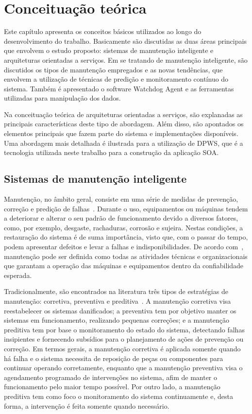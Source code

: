 \chapter{Conceituação teórica}
\label{cha:conceituacao-teorica}

Este capítulo apresenta os conceitos básicos utilizados ao longo do desenvolvimento do trabalho.
Basicamente são discutidas as duas áreas principais que envolvem o estudo proposto: sistemas de
manutenção inteligente e arquiteturas orientadas a serviços. Em se tratando de manutenção
inteligente, são discutidos os tipos de manutenção empregados e as novas tendências, que envolvem a
utilização de técnicas de predição e monitoramento contínuo do sistema. Também é apresentado o
software Watchdog Agent e as ferramentas utilizadas para manipulação dos dados.

Na conceituação teórica de arquiteturas orientadas a serviços, são explanadas as principais
características deste tipo de abordagem. Além disso, são apontados os elementos principais que fazem
parte do sistema e implementações disponíveis. Uma abordagem mais detalhada é ilustrada para a
utilização de \gls{DPWS}, que é a tecnologia utilizada neste trabalho para a construção da aplicação
\gls{SOA}.


\section{Sistemas de manutenção inteligente}
\label{sec:manutencao-inteligente}

Manutenção, no âmbito geral, consiste em uma série de medidas de prevenção, correção e predição de
falhas~\cite{lee2006intelligent}. Durante o uso, equipamentos ou máquinas tendem a deteriorar e
alterar o seu padrão de funcionamento devido a diversos fatores, como, por exemplo, desgaste,
rachaduras, corrosão e sujeira. Nestas condições, a restauração do sistema é de suma importância,
visto que, com o passar do tempo, podem apresentar defeitos e levar a falhas e indisponibilidades.
De acordo com~\cite{marcal2005detectando}, manutenção pode ser definida como todas as atividades
técnicas e organizacionais que garantam a operação das máquinas e equipamentos dentro da
confiabilidade esperada.

Tradicionalmente, são encontrados na literatura três tipos de estratégias de manutenção: corretiva,
preventiva e preditiva~\cite{marcal2005detectando}. A manutenção corretiva visa reestabelecer os
sistemas danificados; a preventiva tem por objetivo manter os sistemas em funcionamento, realizando
pequenas correções; e a manutenção preditiva tem por base o monitoramento do estado do sistema,
detectando falhas insipientes e fornecendo subsídios para o planejamento de ações de prevenção ou
correção. Em termos gerais, a manutenção corretiva é aplicada somente quando há falha e o sistema
necessita de reposição de peças ou componentes para continuar operando corretamente, enquanto que a
manutenção preventiva visa o agendamento programado de intervenções no sistema, afim de manter o
funcionamento pelo maior tempo possível. Por outro lado, a manutenção preditiva tem como foco o
monitoramento do sistema continuamente e, desta forma, a intervenção é feita somente quando
necessário.

